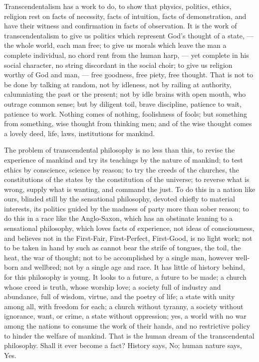 \documentclass[12pt]{article}
\begin{document}

Transcendentalism has a work to do, to show that 
physics, politics, ethics, religion rest on facts of necessity, facts of intuition, facts of demonstration, and 
have their witness and confirmation in facts of observation. It is the work of transcendentalism to give us 
politics which represent God's thought of a state, --- 
the whole world, each man free; to give us morals which 
leave the man a complete individual, no chord rent from 
the human harp, --- yet complete in his social character, 
no string discordant in the social choir; to give us religion worthy of God and man, --- free goodness, free 
piety, free thought. That is not to be done by talking 
at random, not by idleness, not by railing at authority, 
calumniating the past or the present; not by idle brains 
with open mouth, who outrage common sense; but by 
diligent toil, brave discipline, patience to wait, patience 
to work. Nothing comes of nothing, foolishness of 
fools; but something from something, wise thought 
from thinking men; and of the wise thought comes a 
lovely deed, life, laws, institutions for mankind. 

The problem of transcendental philosophy is no less 
than this, to revise the experience of mankind and try 
its teachings by the nature of mankind; to test ethics 
by conscience, science by reason; to try the creeds of 
the churches, the constitutions of the states by the constitution of the universe; to reverse what is wrong, 
supply what is wanting, and command the just. To 
do this in a nation like ours, blinded still by the sensational philosophy, devoted chiefly to material interests, 
its politics guided by the madness of party more than 
sober reason; to do this in a race like the Anglo-Saxon, 
which has an obstinate leaning to a sensational philosophy, which loves facts of experience, not ideas of consciousness, and believes not in the First-Fair, First-Perfect, First-Good, is no light work; not to be taken 
in hand by such as cannot bear the strife of tongues, 
the toil, the heat, the war of thought; not to be accomplished by a single man, however well-born and wellbred; not by a single age and race. It has little of 
history behind, for this philosophy is young. It looks 
to a future, a future to be made; a church whose creed 
is truth, whose worship love; a society full of industry 
and abundance, full of wisdom, virtue, and the poetry 
of life; a state with unity among all, with freedom for 
each; a church without tyranny, a society without 
ignorance, want, or crime, a state without oppression; 
yes, a world with no war among the nations to consume 
the work of their hands, and no restrictive policy to 
hinder the welfare of mankind. That is the human 
dream of the transcendental philosophy. Shall it ever 
become a fact? History says, No; human nature says, 
Yes. 
\end{document}
